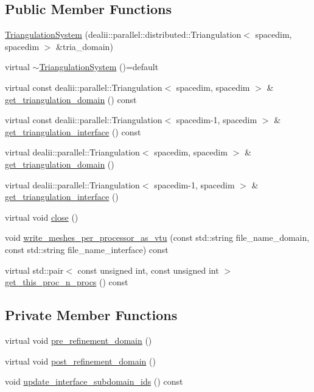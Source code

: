 \subsection*{Public Member Functions}
\begin{DoxyCompactItemize}
\item 
\hyperlink{classparallel_1_1_triangulation_system_a2d0fa99c5da897bedc4d9df93d6cdaf7}{Triangulation\+System} (dealii\+::parallel\+::distributed\+::\+Triangulation$<$ spacedim, spacedim $>$ \&tria\+\_\+domain)
\item 
virtual \hyperlink{classparallel_1_1_triangulation_system_ad12682d17e85ee169fd53cdbe0536f16}{$\sim$\+Triangulation\+System} ()=default
\item 
virtual const dealii\+::parallel\+::\+Triangulation$<$ spacedim, spacedim $>$ \& \hyperlink{classparallel_1_1_triangulation_system_afcd68b5e999d3c656d728e6313d37957}{get\+\_\+triangulation\+\_\+domain} () const 
\item 
virtual const dealii\+::parallel\+::\+Triangulation$<$ spacedim-\/1, spacedim $>$ \& \hyperlink{classparallel_1_1_triangulation_system_a6c80e2e3391aa784100984c6aae834e1}{get\+\_\+triangulation\+\_\+interface} () const 
\item 
virtual dealii\+::parallel\+::\+Triangulation$<$ spacedim, spacedim $>$ \& \hyperlink{classparallel_1_1_triangulation_system_a4901a2f0e26104d5a085253620b98f52}{get\+\_\+triangulation\+\_\+domain} ()
\item 
virtual dealii\+::parallel\+::\+Triangulation$<$ spacedim-\/1, spacedim $>$ \& \hyperlink{classparallel_1_1_triangulation_system_ab799af10ed705dcf903bcd78325762b0}{get\+\_\+triangulation\+\_\+interface} ()
\item 
virtual void \hyperlink{classparallel_1_1_triangulation_system_a5a7ef73bec1fbe698480e1bd7c6cd8a7}{close} ()
\item 
void \hyperlink{classparallel_1_1_triangulation_system_a58151f4fc7d91474a24c5666a18aa354}{write\+\_\+meshes\+\_\+per\+\_\+processor\+\_\+as\+\_\+vtu} (const std\+::string file\+\_\+name\+\_\+domain, const std\+::string file\+\_\+name\+\_\+interface) const 
\item 
virtual std\+::pair$<$ const unsigned int, const unsigned int $>$ \hyperlink{classparallel_1_1_triangulation_system_a7f9b450a3667344b0a291d8e8dfdee18}{get\+\_\+this\+\_\+proc\+\_\+n\+\_\+procs} () const 
\end{DoxyCompactItemize}
\subsection*{Private Member Functions}
\begin{DoxyCompactItemize}
\item 
virtual void \hyperlink{classparallel_1_1_triangulation_system_a79e9789e83e12900c85cf8de0644271f}{pre\+\_\+refinement\+\_\+domain} ()
\item 
virtual void \hyperlink{classparallel_1_1_triangulation_system_a951181f2ad877283d458fa19db42efb2}{post\+\_\+refinement\+\_\+domain} ()
\item 
void \hyperlink{classparallel_1_1_triangulation_system_a2dfa7c2bf13b929a4d1abf685d5b1448}{update\+\_\+interface\+\_\+subdomain\+\_\+ids} () const 
\end{DoxyCompactItemize}
